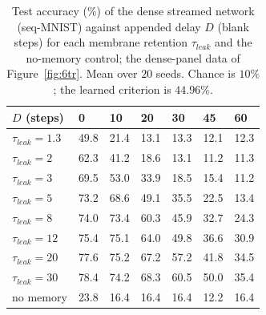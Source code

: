 \begin{table}[H]
    \caption[Source data: dense retention curves (Fig.~\ref{fig:6tr}a).]{Test accuracy
    (\%) of the dense streamed network (seq-MNIST) against appended delay $D$ (blank
    steps) for each membrane retention $\tau_{leak}$ and the no-memory control; the
    dense-panel data of Figure~\ref{fig:6tr}. Mean over $20$ seeds. Chance is $10\%$; the
    learned criterion is $44.96\%$.}
    \begin{center}
    \footnotesize
    \begin{tabularx}{\textwidth}{@{}l *{6}{Y}@{}}
    \toprule
    $D$ (steps) & 0 & 10 & 20 & 30 & 45 & 60 \\
    \midrule
    $\tau_{leak}{=}1.3$ & 49.8 & 21.4 & 13.1 & 13.3 & 12.1 & 12.3 \\
    $\tau_{leak}{=}2$   & 62.3 & 41.2 & 18.6 & 13.1 & 11.2 & 11.3 \\
    $\tau_{leak}{=}3$   & 69.5 & 53.0 & 33.9 & 18.5 & 15.4 & 11.2 \\
    $\tau_{leak}{=}5$   & 73.2 & 68.6 & 49.1 & 35.5 & 22.5 & 13.4 \\
    $\tau_{leak}{=}8$   & 74.0 & 73.4 & 60.3 & 45.9 & 32.7 & 24.3 \\
    $\tau_{leak}{=}12$  & 75.4 & 75.1 & 64.0 & 49.8 & 36.6 & 30.9 \\
    $\tau_{leak}{=}20$  & 77.6 & 75.2 & 67.2 & 57.2 & 41.8 & 34.5 \\
    $\tau_{leak}{=}30$  & 78.4 & 74.2 & 68.3 & 60.5 & 50.0 & 35.4 \\
    no memory           & 23.8 & 16.4 & 16.4 & 16.4 & 12.2 & 16.4 \\
    \bottomrule
    \end{tabularx}
    \label{table:E12}
    \end{center}
    \vspace*{-\baselineskip}
\end{table}

